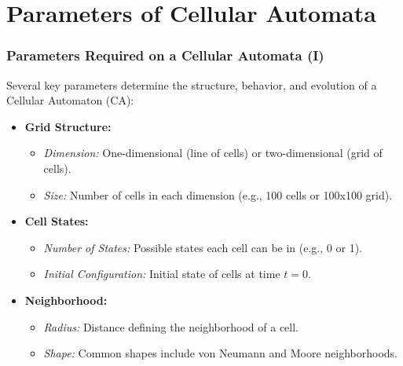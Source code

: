 \documentclass{beamer}
\begin{document}
\section{Parameters of Cellular Automata}
\begin{frame}
    \frametitle{Parameters Required on a Cellular Automata (I)}
    Several key parameters determine the structure, behavior, and evolution of a Cellular Automaton (CA):

    \begin{itemize}
        \item \textbf{Grid Structure:}
        \begin{itemize}
            \item \textit{Dimension:} One-dimensional (line of cells) or two-dimensional (grid of cells).
            \item \textit{Size:} Number of cells in each dimension (e.g., 100 cells or 100x100 grid).
        \end{itemize}
        \item \textbf{Cell States:}
        \begin{itemize}
            \item \textit{Number of States:} Possible states each cell can be in (e.g., 0 or 1).
            \item \textit{Initial Configuration:} Initial state of cells at time \( t = 0 \).
        \end{itemize}
        \item \textbf{Neighborhood:}
        \begin{itemize}
            \item \textit{Radius:} Distance defining the neighborhood of a cell.
            \item \textit{Shape:} Common shapes include von Neumann and Moore neighborhoods.
        \end{itemize}
    \end{itemize}      
\end{frame}
\end{document}
